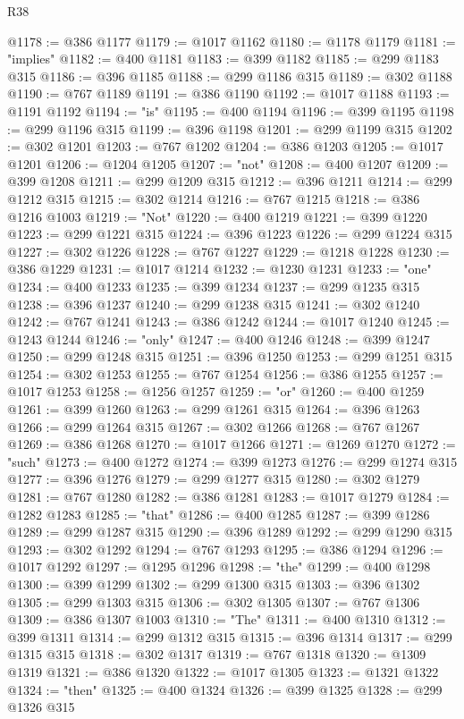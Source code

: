 \begin{lexlean}{R38}
\begin{coremodule}
@1178 := @386 @1177
@1179 := @1017 @1162
@1180 := @1178 @1179
@1181 := "implies"
@1182 := @400 @1181
@1183 := @399 @1182
@1185 := @299 @1183 @315
@1186 := @396 @1185
@1188 := @299 @1186 @315
@1189 := @302 @1188
@1190 := @767 @1189
@1191 := @386 @1190
@1192 := @1017 @1188
@1193 := @1191 @1192
@1194 := "is"
@1195 := @400 @1194
@1196 := @399 @1195
@1198 := @299 @1196 @315
@1199 := @396 @1198
@1201 := @299 @1199 @315
@1202 := @302 @1201
@1203 := @767 @1202
@1204 := @386 @1203
@1205 := @1017 @1201
@1206 := @1204 @1205
@1207 := "not"
@1208 := @400 @1207
@1209 := @399 @1208
@1211 := @299 @1209 @315
@1212 := @396 @1211
@1214 := @299 @1212 @315
@1215 := @302 @1214
@1216 := @767 @1215
@1218 := @386 @1216 @1003
@1219 := "Not"
@1220 := @400 @1219
@1221 := @399 @1220
@1223 := @299 @1221 @315
@1224 := @396 @1223
@1226 := @299 @1224 @315
@1227 := @302 @1226
@1228 := @767 @1227
@1229 := @1218 @1228
@1230 := @386 @1229
@1231 := @1017 @1214
@1232 := @1230 @1231
@1233 := "one"
@1234 := @400 @1233
@1235 := @399 @1234
@1237 := @299 @1235 @315
@1238 := @396 @1237
@1240 := @299 @1238 @315
@1241 := @302 @1240
@1242 := @767 @1241
@1243 := @386 @1242
@1244 := @1017 @1240
@1245 := @1243 @1244
@1246 := "only"
@1247 := @400 @1246
@1248 := @399 @1247
@1250 := @299 @1248 @315
@1251 := @396 @1250
@1253 := @299 @1251 @315
@1254 := @302 @1253
@1255 := @767 @1254
@1256 := @386 @1255
@1257 := @1017 @1253
@1258 := @1256 @1257
@1259 := "or"
@1260 := @400 @1259
@1261 := @399 @1260
@1263 := @299 @1261 @315
@1264 := @396 @1263
@1266 := @299 @1264 @315
@1267 := @302 @1266
@1268 := @767 @1267
@1269 := @386 @1268
@1270 := @1017 @1266
@1271 := @1269 @1270
@1272 := "such"
@1273 := @400 @1272
@1274 := @399 @1273
@1276 := @299 @1274 @315
@1277 := @396 @1276
@1279 := @299 @1277 @315
@1280 := @302 @1279
@1281 := @767 @1280
@1282 := @386 @1281
@1283 := @1017 @1279
@1284 := @1282 @1283
@1285 := "that"
@1286 := @400 @1285
@1287 := @399 @1286
@1289 := @299 @1287 @315
@1290 := @396 @1289
@1292 := @299 @1290 @315
@1293 := @302 @1292
@1294 := @767 @1293
@1295 := @386 @1294
@1296 := @1017 @1292
@1297 := @1295 @1296
@1298 := "the"
@1299 := @400 @1298
@1300 := @399 @1299
@1302 := @299 @1300 @315
@1303 := @396 @1302
@1305 := @299 @1303 @315
@1306 := @302 @1305
@1307 := @767 @1306
@1309 := @386 @1307 @1003
@1310 := "The"
@1311 := @400 @1310
@1312 := @399 @1311
@1314 := @299 @1312 @315
@1315 := @396 @1314
@1317 := @299 @1315 @315
@1318 := @302 @1317
@1319 := @767 @1318
@1320 := @1309 @1319
@1321 := @386 @1320
@1322 := @1017 @1305
@1323 := @1321 @1322
@1324 := "then"
@1325 := @400 @1324
@1326 := @399 @1325
@1328 := @299 @1326 @315

\end{coremodule}
\end{lexlean}
